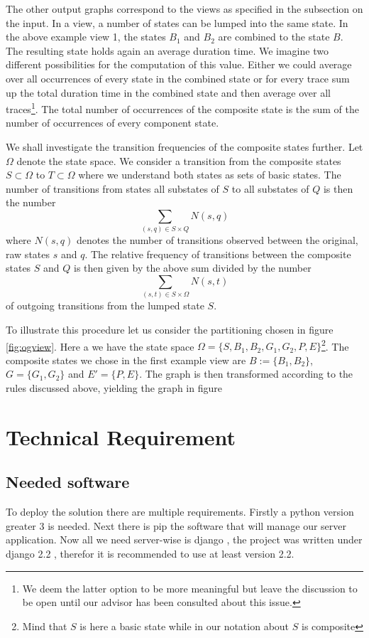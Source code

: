 \documentclass[12pt]{extarticle}
\begin{document}
The other output graphs correspond to the views as specified in the subsection on the input. In a view, a number of states can be lumped into the same state. In the above example view 1, the states $B_1$ and $B_2$ are combined to the state $B$. The resulting state holds again an average duration time. We imagine two different possibilities for the computation of this value. Either we could average over all occurrences of every state in the combined state or for every trace sum up the total duration time in the combined state and then average over all traces\footnote{We deem the latter option to be more meaningful but leave the discussion to be open until our advisor has been consulted about this issue.}. The total number of occurrences of the composite state is the sum of the number of occurrences of every component state. 



We shall investigate the transition frequencies of the composite states further. Let $\Omega$ denote the state space. We consider a transition from the composite states $S \subset \Omega$ to $T \subset \Omega$ where we understand both states as sets of basic states. The number of transitions from states all substates of $S$ to all substates of $Q$ is then the number
\[ 
    \sum_{(s,q) \in S \times Q} N(s,q)
\]
where $N(s,q)$ denotes the number of transitions observed between the original, raw states $s$ and $q$. The relative frequency of transitions between the composite states $S$ and $Q$ is then given by the above sum divided by the number
\[
    \sum_{(s,t) \in S \times \Omega} N(s,t)
\]
of outgoing transitions from the lumped state $S$.

To illustrate this procedure let us consider the partitioning chosen in figure \ref{fig:ogview}. Here a we have the state space $\Omega = \{ S, B_1, B_2, G_1, G_2, P, E \}$\footnote{Mind that $S$ is here a basic state while in our notation about $S$ is composite}. The composite states we chose in the first example view are $B := \{ B_1, B_2 \} $, $G = \{ G_1, G_2 \}$ and $E' = \{ P, E \}$. The graph is then transformed according to the rules discussed above, yielding the graph in figure \

\section{Technical Requirement}

\subsection{Needed software}
To deploy the solution there are multiple requirements. Firstly a python version greater 3 is needed. Next there is pip the software that will manage our server application. Now all we need server-wise is django , the project was written under django 2.2 , therefor it is recommended to use at least version 2.2.
\end{document}

